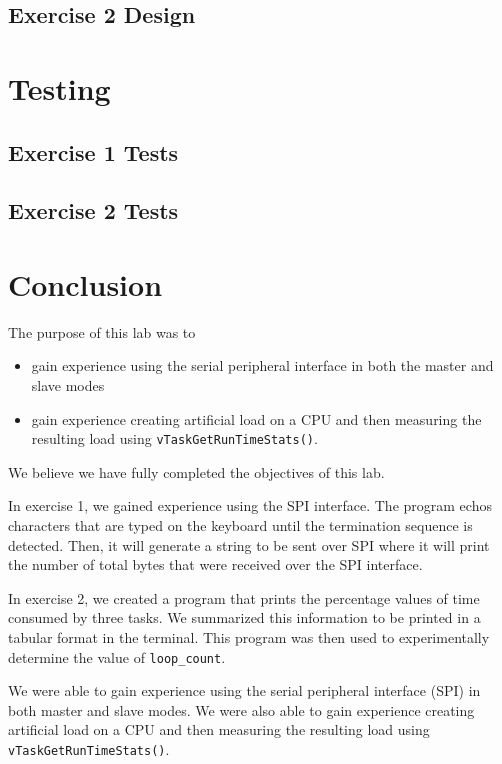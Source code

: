 \documentclass[11pt, letterpaper, titlepage]{article}
\begin{document}
\subsection{Exercise 2 Design}


\section{Testing}

\subsection{Exercise 1 Tests}

\subsection{Exercise 2 Tests}

\section{Conclusion}
The purpose of this lab was to 
\begin{itemize}
  \item gain experience using the serial peripheral interface in both the master and slave modes
  \item gain experience creating artificial load on a CPU and then measuring the resulting load using \texttt{vTaskGetRunTimeStats()}.
\end{itemize}

We believe we have fully completed the objectives of this lab.

In exercise 1, we gained experience using the SPI interface. The program echos characters that are typed on the keyboard until the termination sequence is detected. Then, it will generate a string to be sent over SPI where it will print the number of total bytes that were received over the SPI interface.

In exercise 2, we created a program that prints the percentage values of time consumed by three tasks. We summarized this information to be printed in a tabular format in the terminal. This program was then used to experimentally determine the value of \texttt{loop_count}.

We were able to gain experience using the serial peripheral interface (SPI) in both master and slave modes. We were also able to gain experience creating artificial load on a CPU and then measuring the resulting load using \texttt{vTaskGetRunTimeStats()}.
\end{document}
